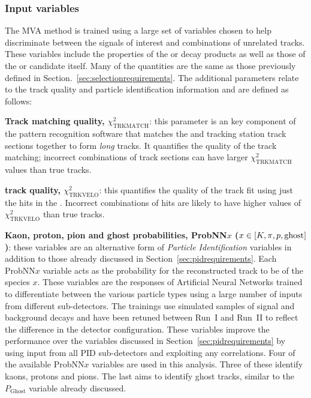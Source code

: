 
\subsubsection{Input variables}


The MVA method is trained using a large set of variables chosen to help discriminate between the signals of interest and combinations of unrelated tracks. These variables include the properties of the \Kpm or \pipm decay products as well as those of the \phiz or \Dsp candidate itself. Many of the quantities are the same as those previously defined in Section.~\ref{sec:selectionrequirements}. The additional parameters relate to the track quality and particle identification information and are defined as follows:

\begin{description}
\item \textbf{Track matching quality, $\chi^{2}_{\text{TRKMATCH}}$}: this parameter is an key component of the pattern recognition software that matches the \velo and tracking station track sections together to form \emph{long} tracks. It quantifies the quality of the track matching; incorrect combinations of track sections can have larger $\chi^{2}_{\text{TRKMATCH}}$ values than true tracks.  

\item \textbf{\velo track quality, $\chi^{2}_{\text{TRKVELO}}$}: this quantifies the quality of the track fit using just the hits in the \velo. Incorrect combinations of hits are likely to have higher values of $\chi^{2}_{\text{TRKVELO}}$ than true tracks.  


\item \textbf{Kaon, proton, pion and ghost probabilities, ProbNN$x$ ($x\in[K,\pi,{p},\text{ghost}]$)}: these variables are an alternative form of \emph{Particle Identification} variables in addition to those already discussed in Section~\ref{sec:pidrequirements}. Each ProbNN$x$ variable acts as the probability for the reconstructed track to be of the species $x$. These variables are the responses of Artificial Neural Networks trained to differentiate between the various particle types using a large number of inputs from different sub-detectors. The trainings use simulated samples of signal and background decays and have been retuned between Run~I and Run~II to reflect the difference in the detector configuration. These variables improve the performance over the variables discussed in Section~\ref{sec:pidrequirements} by using input from all PID sub-detectors and exploiting any correlations.   
 Four of the available ProbNN$x$ variables are used in this analysis. Three of these identify kaons, protons and pions. The last aims to identify ghost tracks, similar to the $P_{\text{Ghost}}$ variable already discussed. 
\end{description}

